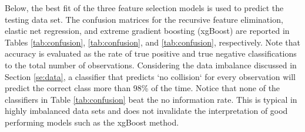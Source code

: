 \documentclass[10pt,a4paper]{article}
\begin{document}

Below, the best fit of the three feature selection models is used to predict the testing data set. The confusion matrices for the recursive feature elimination, elastic net regression, and extreme gradient boosting (xgBoost) are reported in Tables \ref{tab:confusion}, \ref{tab:confusion}, and \ref{tab:confusion}, respectively. Note that accuracy is evaluated as the rate of true positive and true negative classifications to the total number of observations. Considering the data imbalance discussed in Section \ref{se:data}, a classifier that predicts `no collision` for every observation will predict the correct class more than 98\% of the time. Notice that none of the classifiers in Table \ref{tab:confusion} beat the no information rate. This is typical in highly imbalanced data sets and does not invalidate the interpretation of good performing models such as the xgBoost method. %
\end{document}
